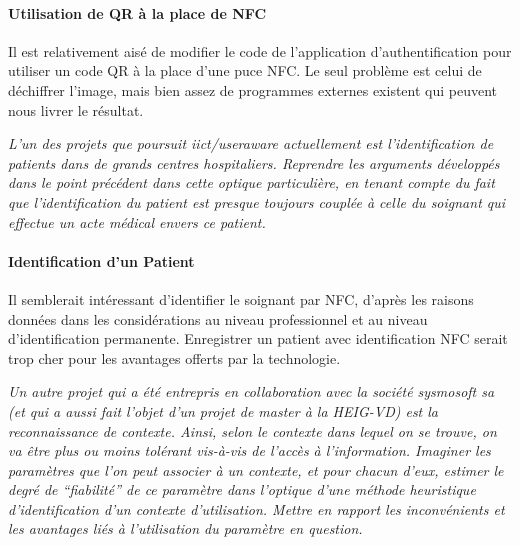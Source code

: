 \documentclass[a4paper,11pt,titlepage]{article}
\begin{document}
\paragraph{Utilisation de QR à la place de NFC}

Il est relativement aisé de modifier le code de l'application d'authentification pour utiliser un code QR à la place d'une puce NFC.
Le seul problème est celui de déchiffrer l'image, mais bien assez de programmes externes existent qui peuvent nous livrer le résultat.

\textit{L'un des projets que poursuit iict/useraware actuellement est l'identification de patients dans de
grands centres hospitaliers. Reprendre les arguments développés dans le point précédent dans cette
optique particulière, en tenant compte du fait que l'identification du patient est presque toujours couplée à
celle du soignant qui effectue un acte médical envers ce patient.}

\paragraph{Identification d'un Patient}
Il semblerait intéressant d'identifier le soignant par NFC, d'après les raisons données dans les considérations au niveau professionnel et au niveau d'identification permanente.
Enregistrer un patient avec identification NFC serait trop cher pour les avantages offerts par la technologie.

\textit{Un autre projet qui a été entrepris en collaboration avec la société sysmosoft sa (et qui a aussi fait
l'objet d'un projet de master à la HEIG-VD) est la reconnaissance  de contexte. Ainsi, selon le contexte dans
lequel on se trouve, on va être plus ou moins tolérant vis-à-vis de l'accès à l'information. Imaginer les
paramètres que l'on peut associer à un contexte, et pour chacun d'eux, estimer le degré de ``fiabilité'' de
ce paramètre dans l'optique d'une méthode heuristique d'identification d'un contexte d'utilisation. Mettre
en rapport les inconvénients et les avantages liés à l'utilisation du paramètre en question.}
\end{document}
